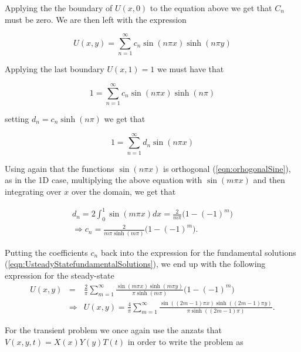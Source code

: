 \documentclass{article}
\begin{document}
Applying the the boundary of $U(x,0)$ to the equation above we get that $C_n$ must be zero. We are then left with the expression

\begin{equation}
U(x,y) = \sum_{n=1}^{\infty} c_n \sin(n\pi x)\sinh(n\pi y)
\label{eqn:UsteadyStatefundamentalSolutions}
\end{equation}

Applying the last boundary $U(x,1) = 1$ we must have that

\begin{equation}
1 = \sum_{n=1}^{\infty} c_n \sin(n\pi x)\sinh(n\pi)
\end{equation}

setting $d_n = c_n\sinh(n\pi)$ we get that 

\begin{equation}
1 = \sum_{n=1}^{\infty} d_n \sin(n\pi x)
\end{equation}

Using again that the functions $\sin(n\pi x)$ is orthogonal (\ref{eqn:orhogonalSine}), as in the 1D case, multiplying the above equation with $ \sin(m\pi x)$ and  then integrating over $x$ over the domain, we get that 

\begin{subequations}
	\begin{eqnarray}
	d_n = 2\int_0^1 \sin(m\pi x) dx = \frac{2}{m\pi}\Big(1-(-1)^m\Big)\\
	\Rightarrow c_n = \frac{2}{m\pi \sinh(m\pi)}\Big(1-(-1)^m\Big).
	\end{eqnarray}
\end{subequations}

Putting the coefficients $c_n$ back into the expression for the fundamental solutions (\ref{eqn:UsteadyStatefundamentalSolutions}), we end up with the following expression for the steady-state
\begin{subequations}
	\begin{eqnarray}
	U(x,y) &=& \frac{2}{\pi} \sum_{m=1}^{\infty} \frac{\sin(m\pi x)\sinh(m\pi y)}{\pi \sinh(m\pi)}\Big(1-(-1)^m \Big)\\ 
	&\Rightarrow & U(x,y) = \frac{4}{\pi} \sum_{m=1}^{\infty} \frac{\sin((2m-1)\pi x)\sinh((2m-1)\pi y)}{\pi \sinh((2m-1)\pi)}.
	\end{eqnarray}
\end{subequations}

For the transient problem we once again use the anzats that $V(x,y,t) = X(x)Y(y)T(t)$ in order to write the problem as
\end{document}
